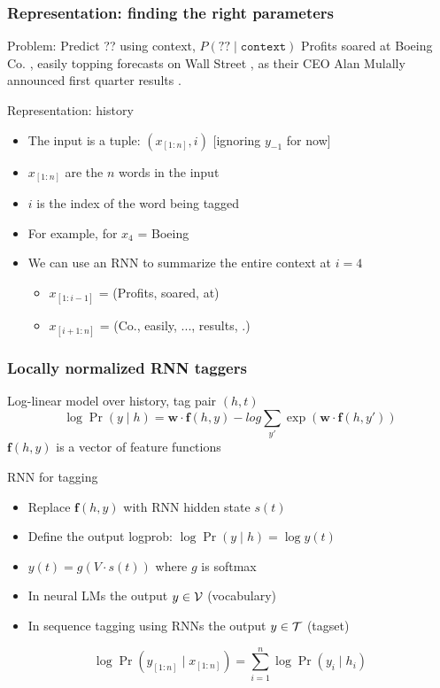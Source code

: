 \begin{frame}
\frametitle{Representation: finding the right parameters}
\begin{block}{Problem: Predict ?? using context, $P(?? \mid \texttt{context})$ }
Profits soared at Boeing Co. , easily topping forecasts on Wall Street , as their CEO Alan Mulally announced first quarter results .
\end{block}
\pause
\begin{block}{Representation: history}
\begin{itemize}
\item The input is a tuple: $(x_{[1:n]}, i)$ [ignoring $y_{-1}$ for now]
\item $x_{[1:n]}$ are the $n$ words in the input
\item $i$ is the index of the word being tagged
\item For example, for $x_4$ = Boeing
\item We can use an RNN to summarize the entire context at $i=4$
    \begin{itemize}
    \item $x_{[1:i-1]}$ = (Profits, soared, at)
    \item $x_{[i+1:n]}$ = (Co., easily, ..., results, .)
    \end{itemize}
\end{itemize}
\end{block}
\end{frame}

\begin{frame}
\frametitle{Locally normalized RNN taggers}
\begin{block}{Log-linear model over history, tag pair $(h,t)$}
\[ \log \Pr(y \mid h) = \textbf{w} \cdot \textbf{f}(h, y) - log \sum_{y'} \exp \left( \textbf{w} \cdot \textbf{f}(h, y') \right) \]
\centering
$\textbf{f}(h, y)$ is a vector of feature functions
\end{block}
\pause
\begin{block}{RNN for tagging}
\begin{itemize}
\item Replace $\textbf{f}(h, y)$ with RNN hidden state $s(t)$
\item Define the output logprob: $\log \Pr(y \mid h) = \log y(t)$
\item $y(t) = g(V \cdot s(t))$ where $g$ is softmax
\item In neural LMs the output $y \in {\cal V}$ (vocabulary)
\item In sequence tagging using RNNs the output $y \in {\cal T}$ (tagset)
\end{itemize}
\[ \log \Pr( y_{[1:n]} \mid x_{[1:n]} ) = \sum_{i=1}^n \log \Pr(y_i \mid h_i) \]
\end{block}
\end{frame}

